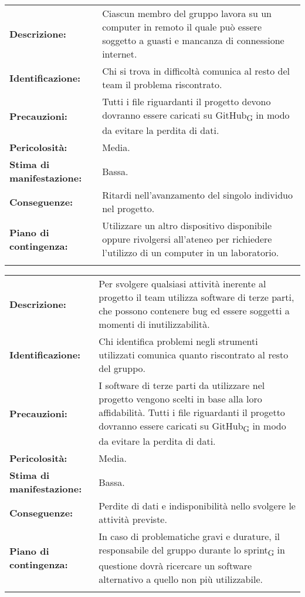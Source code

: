 \vspace{20pt}

\begin{tabularx}{\textwidth}{|X|X|}
\hline
\rowcolor{white}
\multicolumn{2}{|c|}{\textbf{Problemi hardware}} \\
\hline
\textbf{Descrizione:}& Ciascun membro del gruppo lavora su un computer in remoto il quale può essere soggetto a guasti e mancanza di connessione internet.\\
\hline
\textbf{Identificazione:}& Chi si trova in difficoltà comunica al resto del team il problema riscontrato.\\
\hline
\textbf{Precauzioni:}& Tutti i file riguardanti il progetto devono dovranno essere caricati su GitHub\textsubscript{G} in modo da evitare la perdita di dati.\\
\hline
\textbf{Pericolosità:}& Media.\\
\hline
\textbf{Stima di manifestazione:}& Bassa.\\
\hline
\textbf{Conseguenze:}& Ritardi nell'avanzamento del singolo individuo nel progetto.\\
\hline
\textbf{Piano di contingenza:}& Utilizzare un altro dispositivo disponibile oppure rivolgersi all'ateneo per richiedere l'utilizzo di un computer in un laboratorio.\\
\hline
\rowcolor{white}
\caption{Problemi hardware}
\end{tabularx}

\begin{tabularx}{\textwidth}{|X|X|}
\hline
\rowcolor{white}
\multicolumn{2}{|c|}{\textbf{Problemi software}} \\
\hline
\textbf{Descrizione:}& Per svolgere qualsiasi attività inerente al progetto il team utilizza software di terze parti, che possono contenere bug ed essere soggetti a momenti di inutilizzabilità.\\
\hline
\textbf{Identificazione:}& Chi identifica problemi negli strumenti utilizzati comunica quanto riscontrato al resto del gruppo.\\
\hline
\textbf{Precauzioni:}& I software di terze parti da utilizzare nel progetto vengono scelti in base alla loro affidabilità. Tutti i file riguardanti il progetto dovranno essere caricati su GitHub\textsubscript{G} in modo da evitare la perdita di dati.\\
\hline
\textbf{Pericolosità:}& Media.\\
\hline
\textbf{Stima di manifestazione:}& Bassa.\\
\hline
\textbf{Conseguenze:}& Perdite di dati e indisponibilità nello svolgere le attività previste.\\
\hline
\textbf{Piano di contingenza:}& In caso di problematiche gravi e durature, il responsabile del gruppo durante lo sprint\textsubscript{G} in questione dovrà ricercare un software alternativo a quello non più utilizzabile.\\
\hline
\rowcolor{white}
\caption{Problemi software}
\end{tabularx}
\newpage
